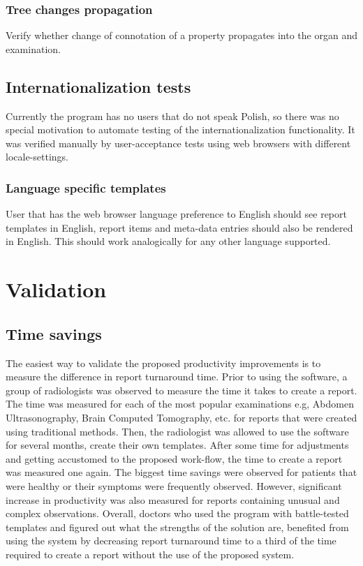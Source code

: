 \documentclass[12pt, twoside, openany]{report}
\theoremstyle{definition}
\begin{document}
	\subsection{Tree changes propagation}
	Verify whether change of connotation of a property propagates into the organ and examination.
	


\section{Internationalization tests}
Currently the program has no users that do not speak Polish, so there was no special motivation to automate testing of the internationalization functionality. It was verified manually by user-acceptance tests using web browsers with different locale-settings.
\subsection{Language specific templates}
User that has the web browser language preference to English should see report templates in English, report items and meta-data entries should also be rendered in English. This should work analogically for any other language supported.




\chapter{Validation}

\section{Time savings}
The easiest way to validate the proposed productivity improvements is to measure the difference in report turnaround time. Prior to using the software, a group of radiologists was observed to measure the time it takes to create a report. The time was measured for each of the most popular examinations e.g, Abdomen Ultrasonography, Brain Computed Tomography, etc. for reports that were created using traditional methods. Then, the radiologist was allowed to use the software for several months, create their own templates. After some time for adjustments and getting accustomed to the proposed work-flow, the time to create a report was measured one again. The biggest time savings were observed for patients that were healthy or their symptoms were frequently observed. However, significant increase in productivity was also measured for reports containing unusual and complex observations. Overall, doctors who used the program with battle-tested templates and figured out what the strengths of the solution are, benefited from using the system by decreasing report turnaround time to a third of the time required to create a report without the use of the  proposed system. 
\end{document}

